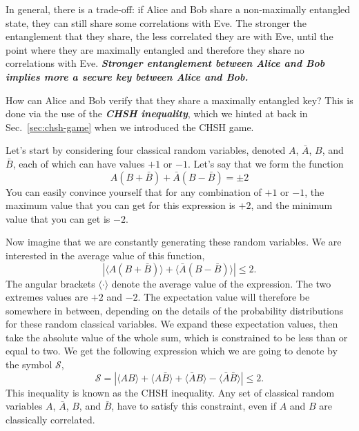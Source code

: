 In general, there is a trade-off: if Alice and Bob share a non-maximally entangled state, they can still share some correlations with Eve.
The stronger the entanglement that they share, the less correlated they are with Eve, until the point where they
are maximally entangled and therefore they share no correlations with Eve.
\textbf{\emph{Stronger entanglement between Alice and Bob implies more a secure key between Alice and Bob.}}

How can Alice and Bob verify that they share a maximally entangled key?
This is done via the use of the \textbf{\emph{CHSH inequality}}, which we hinted at back in Sec.~\ref{sec:chsh-game} when we introduced the CHSH game.

Let's start by considering four classical random variables, denoted $A$,
$\bar{A}$, $B$, and $\bar{B}$, each of which can have values $+1$ or $-1$.
Let's say that we form the function
\begin{equation}
    A(B+\bar{B})+\bar{A}(B-\bar{B})=\pm 2
\end{equation}
You can easily convince yourself that for any combination of $+1$ or $-1$, the maximum value that you can get for this expression is $+2$, and the minimum value that you can get is $-2$.

Now imagine that we are constantly generating these random variables.
We are interested in the average value of this function,
\begin{equation}
    |\langle A(B+\bar{B})\rangle+\langle\bar{A}(B-\bar{B})\rangle| \leq 2.
\end{equation}
The angular brackets $\langle\cdot\rangle$ denote the average value of the expression.
The two extremes values are $+2$ and $-2$.
The expectation value will therefore be somewhere in between, depending on the details of the probability distributions for these random classical variables.
We expand these expectation values, then take the absolute value of the whole sum, which is constrained to be less than or equal to two.
We get the following expression which we are going to denote by the symbol $\mathcal{S}$,
\begin{equation}
    \mathcal{S}=|\langle A B\rangle+\langle A \bar{B}\rangle+\langle\bar{A} B\rangle-\langle\bar{A} \bar{B}\rangle| \leq 2.
    \label{eq:chsh-inequality}
\end{equation}
This inequality is known as the CHSH inequality.
Any set of classical random variables $A$, $\bar{A}$, $B$, and $\bar{B}$, have to satisfy this constraint, even if $A$ and $B$ are classically correlated.

